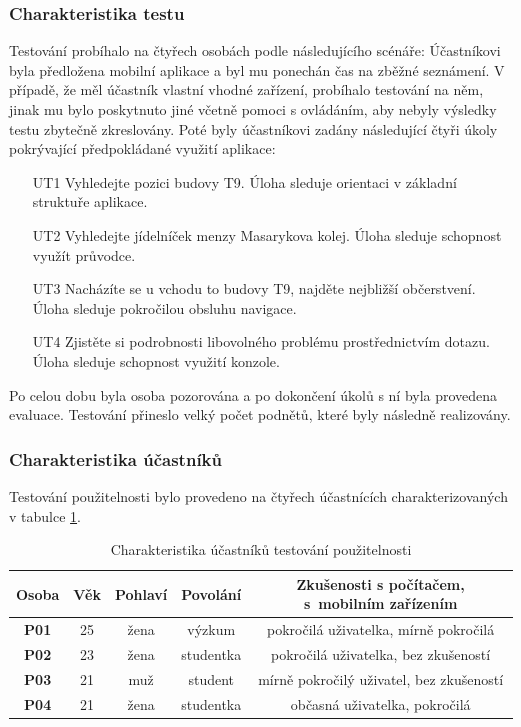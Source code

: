 \subsubsection{Charakteristika testu}
Testování probíhalo na čtyřech osobách podle následujícího scénáře: Účastníkovi byla předložena mobilní aplikace a byl mu ponechán čas na zběžné seznámení. V případě, že měl účastník vlastní vhodné zařízení, probíhalo testování na něm, jinak mu bylo poskytnuto jiné včetně pomoci s ovládáním, aby nebyly výsledky testu zbytečně zkreslovány. Poté byly účastníkovi zadány následující čtyři úkoly pokrývající předpokládané využití aplikace:
\begin{enumerate}
 \item[UT1] Vyhledejte pozici budovy T9. Úloha sleduje orientaci v základní struktuře aplikace.
 \item[UT2] Vyhledejte jídelníček menzy Masarykova kolej. Úloha sleduje schopnost využít průvodce.
 \item[UT3] Nacházíte se u vchodu to budovy T9, najděte nejbližší občerstvení. Úloha sleduje pokročilou obsluhu navigace.
 \item[UT4] Zjistěte si podrobnosti libovolného problému prostřednictvím  dotazu. Úloha sleduje schopnost využití  konzole.
\end{enumerate}
Po celou dobu byla osoba pozorována a po dokončení úkolů s ní byla provedena evaluace. Testování přineslo velký počet podnětů, které byly následně realizovány.

\subsubsection{Charakteristika účastníků}
Testování použitelnosti bylo provedeno na čtyřech účastnících charakterizovaných v tabulce \ref{tab:charakteristikaUcastniku}. %
\begin{table}
\begin{center}
\begin{threeparttable}
\begin{tabular}{|c|c|c|c|c|}
\hline
\textbf{Osoba} & \textbf{Věk} & \textbf{Pohlaví} & \textbf{Povolání} & \parbox{2.2in}{\smallskip\textbf{Zkušenosti s počítačem, s~mobilním zařízením}\smallskip} \\
\hline
\textbf{P01} & 25 & žena & výzkum & \parbox{2.2in}{\smallskip pokročilá uživatelka, mírně pokročilá\smallskip} \\
\textbf{P02} & 23 & žena & studentka & \parbox{2.2in}{\smallskip pokročilá uživatelka, bez zkušeností\smallskip} \\
\textbf{P03} & 21 & muž & student & \parbox{2.2in}{\smallskip mírně pokročilý uživatel, bez zkušeností\smallskip} \\
\textbf{P04} & 21 & žena & studentka & \parbox{2.2in}{\smallskip občasná uživatelka, pokročilá\smallskip} \\
\hline
\end{tabular}
\caption{Charakteristika účastníků testování použitelnosti}
\label{tab:charakteristikaUcastniku}
\end{threeparttable}
\end{center}
\end{table}

